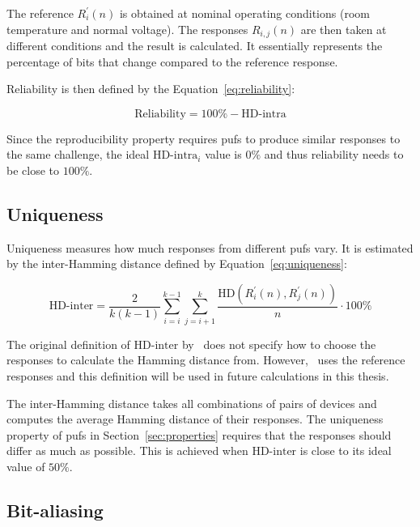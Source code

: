 The reference $R_{i}^{'}(n)$ is obtained at nominal operating conditions (room temperature and normal voltage). The responses $R_{i, j}(n)$ are then taken at different conditions and the result is calculated. It essentially represents the percentage of bits that change compared to the reference response.

Reliability is then defined by the Equation~\ref{eq:reliability}:

\begin{equation}\label{eq:reliability}
    \textrm{Reliability} = 100\% - \textrm{HD-intra}
\end{equation}

Since the reproducibility property requires \glspl{puf} to produce similar responses to the same challenge, the ideal $\textrm{HD-intra}_{i}$ value is $0\%$ and thus reliability needs to be close to $100\%$.

\subsection{Uniqueness}\label{sec:uniqueness}

Uniqueness measures how much responses from different \glspl{puf} vary. It is estimated by the inter-Hamming distance defined by Equation~\ref{eq:uniqueness}:

\begin{equation}\label{eq:uniqueness}
    \textrm{HD-inter} = \frac{2}{k(k-1)}\sum_{i=i}^{k-1} \sum_{j=i+1}^{k} \frac{\textrm{HD}(R_{i}^{'}(n),R_{j}^{'}(n))}{n} \cdot 100\%
\end{equation}

The original definition of $\textrm{HD-inter}$ by~\cite{Maiti2010} does not specify how to choose the responses to calculate the Hamming distance from. However,~\cite{Kodytek2020} uses the reference responses and this definition will be used in future calculations in this thesis.

The inter-Hamming distance takes all combinations of pairs of devices and computes the average Hamming distance of their responses. The uniqueness property of \glspl{puf} in Section~\ref{sec:properties} requires that the responses should differ as much as possible. This is achieved when $\textrm{HD-inter}$ is close to its ideal value of $50\%$.

\subsection{Bit-aliasing}\label{sec:bit_aliasing}

